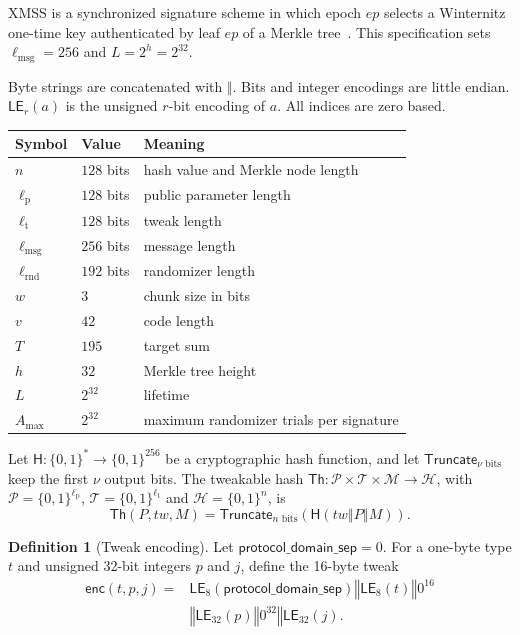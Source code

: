 \documentclass[11pt]{article}
\theoremstyle{definition}
\newtheorem{definition}{Definition}[section]
\theoremstyle{plain}
\theoremstyle{remark}
\newcommand{\bits}[1]{\{0,1\}^{#1}}
\newcommand{\Th}{\mathsf{Th}}
\newcommand{\hash}{\mathsf{H}}
\newcommand{\LE}{\mathsf{LE}}
\newcommand{\Truncate}{\mathsf{Truncate}}
\newcommand{\concat}{\mathbin\Vert}
\newcommand{\ep}{\mathit{ep}}
\newcommand{\tw}{\mathit{tw}}
\newcommand{\lmsg}{\ell_{\mathrm{msg}}}
\newcommand{\lpar}{\ell_{\mathrm{p}}}
\newcommand{\ltwk}{\ell_{\mathrm{t}}}
\newcommand{\lrnd}{\ell_{\mathrm{rnd}}}
\newcommand{\amax}{A_{\max}}
\begin{document}
XMSS is a synchronized signature scheme in which epoch $\ep$ selects a Winternitz one-time key authenticated by leaf $\ep$ of a Merkle tree~\cite{RFC8391}. This specification sets $\lmsg=256$ and $L=2^h=2^{32}$.

Byte strings are concatenated with $\concat$. Bits and integer encodings are little endian. $\LE_r(a)$ is the unsigned $r$-bit encoding of $a$. All indices are zero based.

\begin{center}
\begin{tabular}{@{}lll@{}}
\toprule
Symbol & Value & Meaning\\
\midrule
$n$ & $128$ bits & hash value and Merkle node length\\
$\lpar$ & $128$ bits & public parameter length\\
$\ltwk$ & $128$ bits & tweak length\\
$\lmsg$ & $256$ bits & message length\\
$\lrnd$ & $192$ bits & randomizer length\\
$w$ & $3$ & chunk size in bits\\
$v$ & $42$ & code length\\
$T$ & $195$ & target sum\\
$h$ & $32$ & Merkle tree height\\
$L$ & $2^{32}$ & lifetime\\
$\amax$ & $2^{32}$ & maximum randomizer trials per signature\\
\bottomrule
\end{tabular}
\end{center}

Let $\hash:\bits{*}\to\bits{256}$ be a cryptographic hash function, and let $\Truncate_{\nu\text{ bits}}$ keep the first $\nu$ output bits. The tweakable hash $\Th:\mathcal P\times\mathcal T\times\mathcal M\to\mathcal H$, with $\mathcal P=\bits{\lpar}$, $\mathcal T=\bits{\ltwk}$ and $\mathcal H=\bits{n}$, is
\[
  \Th(P,\tw,M)=\Truncate_{n\text{ bits}}\!\left(\hash(\tw\concat P\concat M)\right).
\]

\begin{definition}[Tweak encoding]
Let $\mathsf{protocol\_domain\_sep}=0$. For a one-byte type $t$ and unsigned 32-bit integers $p$ and $j$, define the 16-byte tweak
\[
\begin{aligned}
  \mathsf{enc}(t,p,j)={}&\LE_8(\mathsf{protocol\_domain\_sep})\concat\LE_8(t)\concat0^{16}\\
  &{}\concat\LE_{32}(p)\concat0^{32}\concat\LE_{32}(j).
\end{aligned}
\]
\end{definition}
\end{document}
